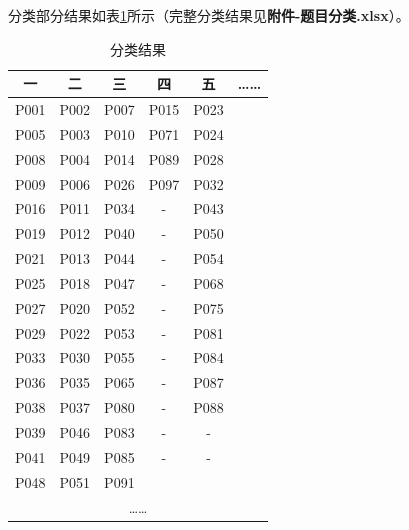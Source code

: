 分类部分结果如表\ref{talbe041618}所示（完整分类结果见\textbf{附件-题目分类.xlsx}）。

\begin{table}[h]
    \label{talbe041618}
    \caption{分类结果}
    \centering
    \begin{tabular}{@{}cccccc@{}}
        \toprule
        \quad \quad 一 \quad \quad   & \quad \quad 二 \quad \quad  & \quad \quad 三 \quad \quad   & \quad \quad 四 \quad \quad                  & \quad \quad 五 \quad \quad    & \quad \quad …… \quad \quad                  \\ \midrule
        P001 & P002 & P007 & P015                 & P023 &                      \\
        P005 & P003 & P010 & P071                 & P024 &                      \\
        P008 & P004 & P014 & P089                 & P028 &                      \\
        P009 & P006 & P026 & P097                 & P032 &                      \\
        P016 & P011 & P034 &  -                   & P043 &                      \\
        P019 & P012 & P040 &  -                   & P050 &                      \\
        P021 & P013 & P044 &  -                   & P054 &                      \\
        P025 & P018 & P047 &  -                   & P068 &                      \\
        P027 & P020 & P052 &  -                   & P075 &                      \\
        P029 & P022 & P053 &  -                   & P081 &                      \\
        P033 & P030 & P055 &  -                   & P084 &                      \\
        P036 & P035 & P065 &  -                   & P087 &                      \\
        P038 & P037 & P080 &  -                   & P088 &                      \\
        P039 & P046 & P083 &  -                   & -    &                      \\
        P041 & P049 & P085 &  -                   & -    &                      \\
        P048 & P051 & P091 & \multicolumn{1}{l}{} &     & \multicolumn{1}{l}{} \\
        \multicolumn{6}{c}{……}                                                  \\ \bottomrule
        \end{tabular}
\end{table}

